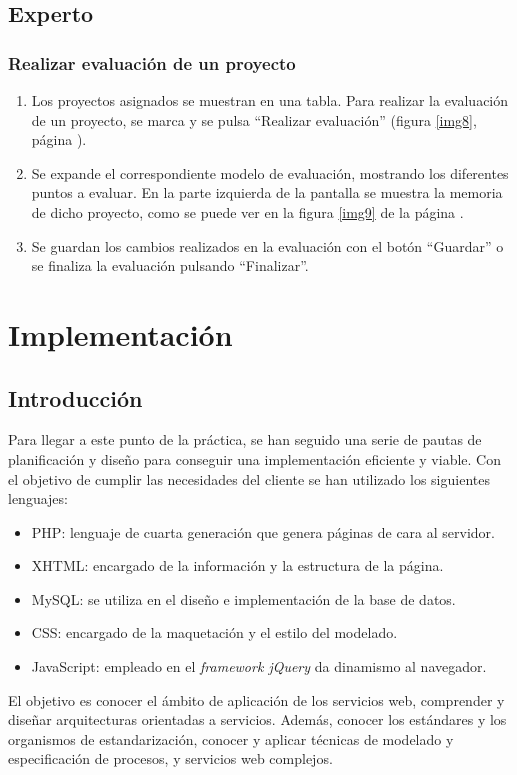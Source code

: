 \documentclass[11pt,a4paper,spanish,twoside]{book}
\begin{document}
\section{Experto}
\subsection{Realizar evaluación de un proyecto}
\begin{enumerate}
\item Los proyectos asignados se muestran en una tabla. Para realizar la 
  evaluación de un proyecto, se marca y se pulsa ``Realizar evaluación''
  (figura \ref{img8}, página \pageref{img8}). 


\item Se expande el correspondiente modelo de evaluación, mostrando los 
  diferentes puntos a evaluar. En la parte izquierda de la pantalla se
  muestra la memoria de dicho proyecto, como se puede ver en la figura
  \ref{img9} de la página \pageref{img9}. 


\item Se guardan los cambios realizados en la evaluación con el botón 
  ``Guardar'' o se finaliza la evaluación pulsando ``Finalizar''.
\end{enumerate}

\chapter{Implementación}
\section{Introducción}
Para llegar a este punto de la práctica, se han seguido una serie de pautas de
planificación y diseño para conseguir una implementación eficiente y viable.
Con el objetivo de cumplir las necesidades del cliente se han utilizado los
siguientes lenguajes:
\begin{itemize}
\item PHP\cite{achour}: lenguaje de cuarta generación que genera páginas de cara
al servidor.
\item XHTML\cite{wc}: encargado de la información y la estructura de la página.
\item MySQL: se utiliza en el diseño e implementación de la base de datos.
\item CSS\cite{wc}: encargado de la maquetación y el estilo del modelado.
\item JavaScript\cite{resig}: empleado en el \emph{framework jQuery} da 
dinamismo al navegador.
\end{itemize} 
El objetivo es conocer el ámbito de aplicación de los servicios web, comprender 
y diseñar arquitecturas orientadas a servicios. Además, conocer los estándares y
los organismos de estandarización, conocer y aplicar técnicas de modelado y 
especificación de procesos, y servicios web complejos.
\end{document}

